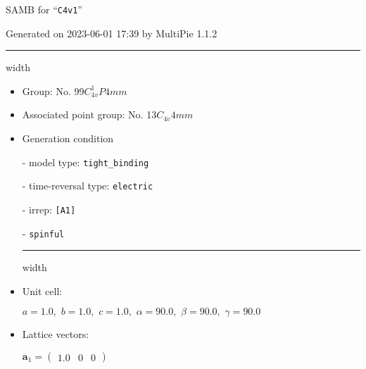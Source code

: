 \documentclass[fleqn,10pt,landscape]{article}
\begin{document}
\setcounter{MaxMatrixCols}{16}

\setlength{\baselineskip}{16pt}
\footnotesize
\begin{center}
\LARGE
SAMB for ``\texttt{C4v1}''
\end{center}
\begin{flushright}
Generated on 2023-06-01 17:39 by MultiPie 1.1.2
\end{flushright}
\vspace{1cm}


 \hfil \hrule height 1mm width \textwidth \hfil

\begin{itemize}
\item Group: No. 99\quad$C_{4v}^{1}$\quad$P4mm$\quad[ tetragonal ]

\item Associated point group: No. 13\quad$C_{4v}$\quad$4mm$\quad[ tetragonal ]

\vspace{5mm}

\item Generation condition

\quad - model type: \texttt{tight_binding}

\quad - time-reversal type: \texttt{electric}

\quad - irrep: \texttt{[A1]}

\quad - \texttt{spinful}


 \hfil \hrule height 1mm width \textwidth \hfil

\item Unit cell:

\quad $a=1.0,\,\, b=1.0,\,\, c=1.0,\,\, \alpha=90.0,\,\, \beta=90.0,\,\, \gamma=90.0$

\item Lattice vectors:

\quad $\bm{a}_1=\begin{pmatrix} 1.0 & 0 & 0 \end{pmatrix}$


\end{itemize}
\end{document}
